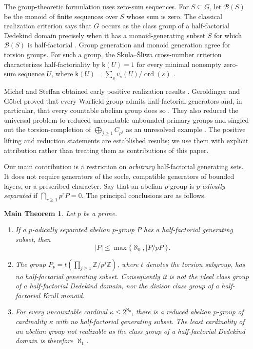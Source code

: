 \documentclass[11pt,reqno]{amsart}
\numberwithin{equation}{section}
\newtheorem*{maintheorem}{Main Theorem}
\theoremstyle{definition}
\theoremstyle{remark}
\newcommand{\Z}{\mathbb Z}
\newcommand{\B}{\mathcal B}
\DeclareMathOperator{\ord}{ord}
\begin{document}
The group-theoretic formulation uses zero-sum sequences. For
$S\subseteq G$, let $\B(S)$ be the monoid of finite sequences over
$S$ whose sum is zero. The classical realization criterion says
that $G$ occurs as the class group of a half-factorial Dedekind
domain precisely when it has a monoid-generating subset $S$ for
which $\B(S)$ is half-factorial
\cite[Theorem~3.6]{ChapmanGeroldinger}. Group generation and monoid
generation agree for torsion groups. For such a group, the
Skula--\'{S}liwa cross-number criterion characterizes half-factoriality
by $\mathsf k(U)=1$ for every minimal nonempty zero-sum sequence $U$,
where $\mathsf k(U)=\sum_s v_s(U)/\ord(s)$
\cite[Lemma~3.2]{GaoGeroldinger}.

Michel and Steffan obtained early positive realization results
\cite{MichelSteffan}. Geroldinger and G\"obel proved that every
Warfield group admits half-factorial generators and, in particular,
that every countable abelian group does so
\cite[Theorems~5.1 and~5.3]{GeroldingerGoebel}. They also reduced
the universal problem to reduced uncountable unbounded primary
groups and singled out the torsion-completion of
$\bigoplus_{j\ge1}C_{p^j}$ as an unresolved example
\cite[pp.~855--856]{GeroldingerGoebel}. The positive lifting and
reduction statements are established results; we use them with
explicit attribution rather than treating them as contributions
of this paper.

Our main contribution is a restriction on \emph{arbitrary}
half-factorial generating sets. It does not require generators of
the socle, compatible generators of bounded layers, or a prescribed
character. Say that an abelian $p$-group is \emph{$p$-adically
separated} if $\bigcap_{r\ge1}p^rP=0$. The principal conclusions
are as follows.

\begin{maintheorem}
Let $p$ be a prime.
\begin{enumerate}[label=\textup{(\arabic*)},leftmargin=2.2em]
\item If a $p$-adically separated abelian $p$-group $P$ has a
half-factorial generating subset, then
\[
 |P|\le\max\{\aleph_0,|P/pP|\}.
\]
\item The group $P_p=t(\prod_{j\ge1}\Z/p^j\Z)$, where $t$ denotes
the torsion subgroup, has no half-factorial generating subset.
Consequently it is not the ideal class group of a half-factorial
Dedekind domain, nor the divisor class group of a half-factorial
Krull monoid.
\item For every uncountable cardinal $\kappa\le2^{\aleph_0}$,
there is a reduced abelian $p$-group of cardinality $\kappa$ with
no half-factorial generating subset. The least cardinality of an
abelian group not realizable as the class group of a half-factorial
Dedekind domain is therefore $\aleph_1$.
\end{enumerate}
\end{maintheorem}
\end{document}

